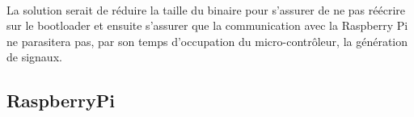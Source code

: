 \paragraph{}
  La solution serait de réduire la taille du binaire pour s'assurer de ne pas
réécrire sur le bootloader et ensuite s'assurer que la communication avec la
Raspberry Pi ne parasitera pas, par son temps d'occupation du
micro-contrôleur, la génération de signaux.\\


\subsection{RaspberryPi}
